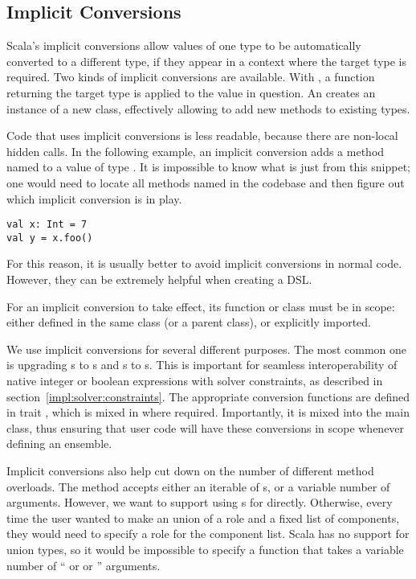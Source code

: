 
\subsection{Implicit Conversions}

Scala's implicit conversions allow values of one type to be automatically converted to a
different type, if they appear in a context where the target type is required. Two kinds
of implicit conversions are available. With , a function returning the
target type is applied to the value in question. An  creates an
instance of a new class, effectively allowing to add new methods to existing types.

Code that uses implicit conversions is less readable, because there are non-local hidden
calls. In the following example, an implicit conversion adds a method named  to
a value of type . It is impossible to know what is  just from this
snippet; one would need to locate all methods named  in the codebase and then
figure out which implicit conversion is in play.
\begin{lstlisting}[style=snippet]
val x: Int = 7
val y = x.foo()
\end{lstlisting}
\noindent
For this reason, it is usually better to avoid implicit conversions in normal code.
However, they can be extremely helpful when creating a DSL.

For an implicit conversion to take effect, its function or class must be in scope:
either defined in the same class (or a parent class), or explicitly imported.

\medskip

We use implicit conversions for several different purposes. The most common one is
upgrading s to s and s to s. This is
important for seamless interoperability of native integer or boolean expressions with
solver constraints, as described in section~\ref{impl:solver:constraints}. The
appropriate conversion functions are defined in trait , which is
mixed in where required. Importantly, it is mixed into the main  class,
thus ensuring that user code will have these conversions in scope whenever defining an
ensemble.

\medskip

Implicit conversions also help cut down on the number of different method overloads. The
method  accepts either an iterable of s, or a variable
number of  arguments. However, we want to support using s
for  directly. Otherwise, every time the user wanted to make an union of a
role and a fixed list of components, they would need to specify a role for the component
list. Scala has no support for union types, so it would be impossible to specify a
function that takes a variable number of `` or  or
'' arguments.

